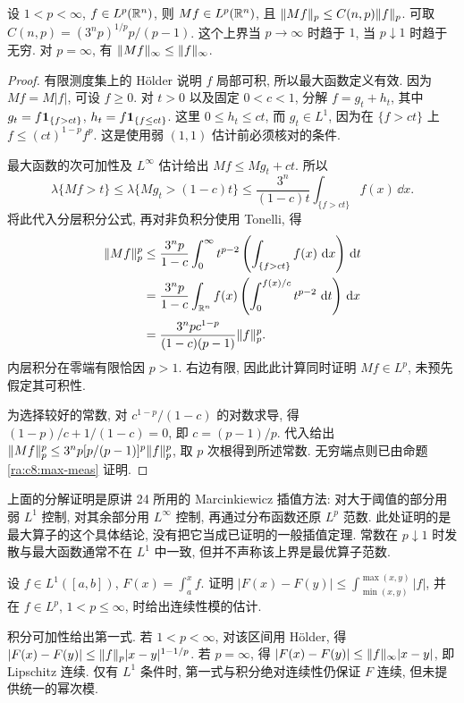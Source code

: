 \begin{theorem}\label{ra:c8:strong}
设 $1<p<\infty$, $f\in L^p(\mathbb R^n)$, 则 $Mf\in L^p(\mathbb R^n)$, 且
$\lVert Mf\rVert_p\le C(n,p)\lVert f\rVert_p$.
可取 $C(n,p)=(3^np)^{1/p}p/(p-1)$. 这个上界当 $p\to\infty$ 时趋于 $1$, 当 $p\downarrow1$ 时趋于无穷. 对 $p=\infty$, 有 $\lVert Mf\rVert_\infty\le\lVert f\rVert_\infty$.
\end{theorem}
\begin{proof}
有限测度集上的 Hölder 说明 $f$ 局部可积, 所以最大函数定义有效. 因为 $Mf=M|f|$, 可设 $f\ge0$. 对 $t>0$ 以及固定 $0<c<1$, 分解
$f=g_t+h_t$, 其中 $g_t=f\mathbf 1_{\{f>ct\}}$, $h_t=f\mathbf 1_{\{f\le ct\}}$.
这里 $0\le h_t\le ct$, 而 $g_t\in L^1$, 因为在 $\{f>ct\}$ 上 $f\le(ct)^{1-p}f^p$. 这是使用弱 $(1,1)$ 估计前必须核对的条件.

最大函数的次可加性及 $L^\infty$ 估计给出 $Mf\le Mg_t+ct$. 所以
\[
 \lambda\{Mf>t\}
 \le\lambda\{Mg_t>(1-c)t\}
 \le\frac{3^n}{(1-c)t}\int_{\{f>ct\}}f(x)\,\dd x.
\]
将此代入分层积分公式, 再对非负积分使用 Tonelli, 得
\begin{align*}
 \lVert Mf\rVert_p^p
 &\le\frac{3^np}{1-c}\int_0^\infty t^{p-2}
       \left(\int_{\{f>ct\}}f(x)\,\,\mathrm d x\right)\,\mathrm d t\\
 &=\frac{3^np}{1-c}\int_{\mathbb R^n}f(x)
       \left(\int_0^{f(x)/c}t^{p-2}\,\,\mathrm d t\right)\,\mathrm d x\\
 &=\frac{3^npc^{1-p}}{(1-c)(p-1)}\lVert f\rVert_p^p.
\end{align*}
内层积分在零端有限恰因 $p>1$. 右边有限, 因此此计算同时证明 $Mf\in L^p$, 未预先假定其可积性.

为选择较好的常数, 对 $c^{1-p}/(1-c)$ 的对数求导, 得 $(1-p)/c+1/(1-c)=0$, 即 $c=(p-1)/p$. 代入给出
$\lVert Mf\rVert_p^p\le3^np[p/(p-1)]^p\lVert f\rVert_p^p$,
取 $p$ 次根得到所述常数. 无穷端点则已由命题 \ref{ra:c8:max-meas} 证明.
\end{proof}

\begin{remark}
上面的分解证明是原讲 24 所用的 Marcinkiewicz 插值方法: 对大于阈值的部分用弱 $L^1$ 控制, 对其余部分用 $L^\infty$ 控制, 再通过分布函数还原 $L^p$ 范数. 此处证明的是最大算子的这个具体结论, 没有把它当成已证明的一般插值定理. 常数在 $p\downarrow1$ 时发散与最大函数通常不在 $L^1$ 中一致, 但并不声称该上界是最优算子范数.
\end{remark}


\begin{exercise}
设 $f\in L^1([a,b])$, $F(x)=\int_a^xf$. 证明 $|F(x)-F(y)|\le\int_{\min(x,y)}^{\max(x,y)}|f|$, 并在 $f\in L^p$, $1<p\le\infty$, 时给出连续性模的估计.
\end{exercise}
\begin{solution}
积分可加性给出第一式. 若 $1<p<\infty$, 对该区间用 Hölder, 得
$|F(x)-F(y)|\le\lVert f\rVert_p|x-y|^{1-1/p}$.
若 $p=\infty$, 得 $|F(x)-F(y)|\le\lVert f\rVert_\infty|x-y|$, 即 Lipschitz 连续. 仅有 $L^1$ 条件时, 第一式与积分绝对连续性仍保证 $F$ 连续, 但未提供统一的幂次模.
\end{solution}


